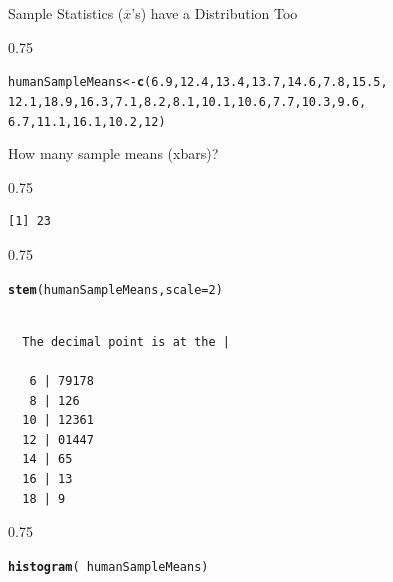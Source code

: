 \documentclass{beamer}\usepackage[]{graphicx}\usepackage[]{color}
\makeatletter
\newcommand{\hlnum}[1]{\textcolor[rgb]{0.2,0.2,0.2}{#1}}%
\newcommand{\hlopt}[1]{\textcolor[rgb]{0.102,0.102,0.102}{#1}}%
\newcommand{\hlstd}[1]{\textcolor[rgb]{0.102,0.102,0.102}{#1}}%
\newcommand{\hlkwb}[1]{\textcolor[rgb]{0.102,0.102,0.102}{#1}}%
\newcommand{\hlkwc}[1]{\textcolor[rgb]{0.2,0.2,0.2}{#1}}%
\newcommand{\hlkwd}[1]{\textcolor[rgb]{0.102,0.102,0.102}{\textbf{#1}}}%
\newenvironment{kframe}{%
 \def\at@end@of@kframe{}%
 \ifinner\ifhmode%
  \def\at@end@of@kframe{\end{minipage}}%
  \begin{minipage}{\columnwidth}%
 \fi\fi%
 \def\FrameCommand##1{\hskip\@totalleftmargin \hskip-\fboxsep
 \colorbox{shadecolor}{##1}\hskip-\fboxsep
     \hskip-\linewidth \hskip-\@totalleftmargin \hskip\columnwidth}%
 \MakeFramed {\advance\hsize-\width
   \@totalleftmargin\z@ \linewidth\hsize
   \@setminipage}}%
 {\par\unskip\endMakeFramed%
 \at@end@of@kframe}
\newenvironment{knitrout}{}{} %
\renewenvironment{knitrout}{\begin{spacing}{0.75}\begin{tiny}}{\end{tiny}\end{spacing}}
\newcommand{\xbar}{\overline{x}}
\makeatother
\begin{document}
\begin{frame}{Sample Statistics ($\xbar$'s) have a Distribution Too\;\;}
\begin{knitrout}\small
{}\color{fgcolor}\begin{kframe}
\begin{alltt}
\hlstd{humanSampleMeans} \hlkwb{<-} \hlkwd{c}\hlstd{(}\hlnum{6.9}\hlstd{,} \hlnum{12.4}\hlstd{,} \hlnum{13.4}\hlstd{,} \hlnum{13.7}\hlstd{,} \hlnum{14.6}\hlstd{,} \hlnum{7.8}\hlstd{,} \hlnum{15.5}\hlstd{,}
    \hlnum{12.1}\hlstd{,} \hlnum{18.9}\hlstd{,} \hlnum{16.3}\hlstd{,} \hlnum{7.1}\hlstd{,} \hlnum{8.2}\hlstd{,} \hlnum{8.1}\hlstd{,} \hlnum{10.1}\hlstd{,} \hlnum{10.6}\hlstd{,} \hlnum{7.7}\hlstd{,} \hlnum{10.3}\hlstd{,} \hlnum{9.6}\hlstd{,}
    \hlnum{6.7}\hlstd{,} \hlnum{11.1}\hlstd{,} \hlnum{16.1}\hlstd{,} \hlnum{10.2}\hlstd{,} \hlnum{12}\hlstd{)}
\end{alltt}
\end{kframe}
\end{knitrout}
How many sample means (xbars)?
\begin{knitrout}\small
{}\color{fgcolor}\begin{kframe}
\begin{verbatim}
[1] 23
\end{verbatim}
\end{kframe}
\end{knitrout}
\begin{knitrout}\small
{}\color{fgcolor}\begin{kframe}
\begin{alltt}
\hlkwd{stem}\hlstd{(humanSampleMeans,} \hlkwc{scale}\hlstd{=}\hlnum{2}\hlstd{)}
\end{alltt}
\begin{verbatim}

  The decimal point is at the |

   6 | 79178
   8 | 126
  10 | 12361
  12 | 01447
  14 | 65
  16 | 13
  18 | 9
\end{verbatim}
\end{kframe}
\end{knitrout}

\newpage

\begin{knitrout}\small
{}\color{fgcolor}\begin{kframe}
\begin{alltt}
\hlkwd{histogram}\hlstd{(}\hlopt{~} \hlstd{humanSampleMeans)}
\end{alltt}
\end{kframe}


\end{knitrout}
\end{frame}
\end{document}
